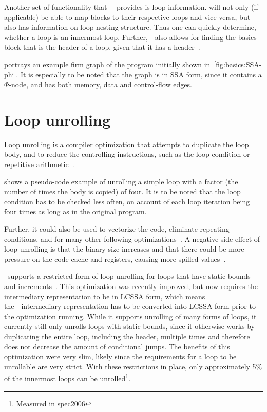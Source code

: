 Another set of functionality that~\libFIRM~ provides is loop information.
\libFIRM{} will not only (if applicable) be able to map blocks to their respective loops and vice-versa, but also has information on loop nesting structure.
Thus one can quickly determine, whether a loop is an innermost loop\cite{libfirm}.
Further,~\libFIRM~also allows for finding the basics block that is the header of a loop, given that it has a header~\cite{aebi18bachelorarbeit}.

 portrays an example firm graph of the program initially shown in~\cref{fig:basics:SSA-phi}.
It is especially to be noted that the graph is in SSA form, since it contains a $\Phi$-node, and has both memory, data and control-flow edges.


\section{Loop unrolling}\label{sec:basics:unrolling}

Loop unrolling is a compiler optimization that attempts to duplicate the loop body, and to reduce the controlling instructions, such as the loop condition or repetitive arithmetic~\cite{aho_ullman_1979}.

 shows a pseudo-code example of unrolling a simple loop with a factor (the number of times the body is copied) of four.
It is to be noted that the loop condition has to be checked less often, on account of each loop iteration being four times as long as in the original program.

Further, it could also be used to vectorize the code, eliminate repeating conditions, and for many other following optimizations~\cite{fog_2018}.
A negative side effect of loop unrolling is that the binary size increases and that there could be more pressure on the code cache and registers, causing more spilled values~\cite{Sarkar2001}.

\libFIRM~supports a restricted form of loop unrolling for loops that have static bounds and increments~\cite{helmer10studienarbeit}.
This optimization was recently improved, but now requires the intermediary representation to be in LCSSA form, which means the~\libFIRM~intermediary representation has to be converted into LCSSA form prior to the optimization running\cite{aebi18bachelorarbeit}.
While it supports unrolling of many forms of loops, it currently still only unrolls loops with static bounds, since it otherwise works by duplicating the entire loop, including the header, multiple times and therefore does not decrease the amount of conditional jumps.
The benefits of this optimization were very slim, likely since the requirements for a loop to be unrollable are very strict.
With these restrictions in place, only approximately 5\% of the innermost loops can be unrolled\footnote{Measured in spec2006}.


